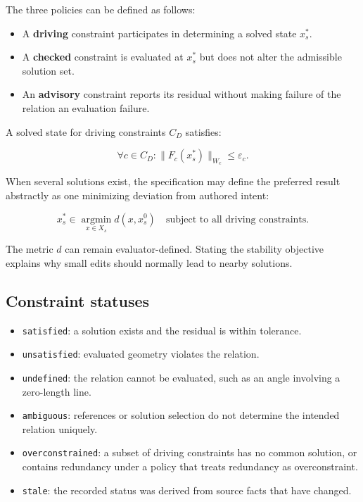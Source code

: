 \documentclass[11pt]{article}
\newcommand{\Type}[1]{\texttt{#1}}
\begin{document}
The three policies can be defined as follows:

\begin{itemize}
  \item A \textbf{driving} constraint participates in determining a solved state
    $x_s^*$.
  \item A \textbf{checked} constraint is evaluated at $x_s^*$ but does not alter
    the admissible solution set.
  \item An \textbf{advisory} constraint reports its residual without making
    failure of the relation an evaluation failure.
\end{itemize}

A solved state for driving constraints $C_D$ satisfies:

\[
\forall c\in C_D:
\lVert F_c(x_s^*)\rVert_{W_c}\leq\varepsilon_c.
\]

When several solutions exist, the specification may define the preferred
result abstractly as one minimizing deviation from authored intent:

\[
x_s^*\in
\operatorname*{argmin}_{x\in X_s}
d(x,x_s^0)
\quad
\text{subject to all driving constraints.}
\]

The metric $d$ can remain evaluator-defined. Stating the stability objective
explains why small edits should normally lead to nearby solutions.

\subsection{Constraint statuses}

\begin{itemize}
  \item \Type{satisfied}: a solution exists and the residual is within tolerance.
  \item \Type{unsatisfied}: evaluated geometry violates the relation.
  \item \Type{undefined}: the relation cannot be evaluated, such as an angle
    involving a zero-length line.
  \item \Type{ambiguous}: references or solution selection do not determine the
    intended relation uniquely.
  \item \Type{overconstrained}: a subset of driving constraints has no common
    solution, or contains redundancy under a policy that treats redundancy as
    overconstraint.
  \item \Type{stale}: the recorded status was derived from source facts that
    have changed.
\end{itemize}
\end{document}
